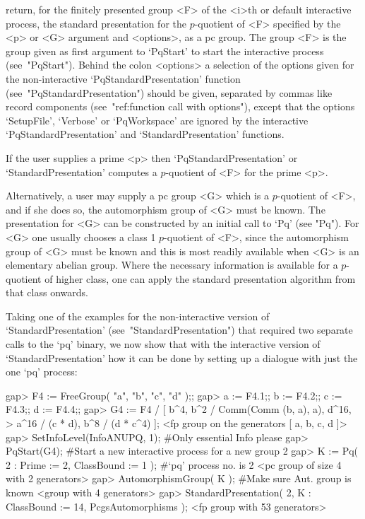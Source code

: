 return, for the finitely presented group <F>  of  the  <i>th  or  default
interactive  {\ANUPQ}  process,  the  standard   presentation   for   the
$p$-quotient of <F> specified by the <p> or <G> argument  and  <options>,
as a pc group. The group <F> is the group  given  as  first  argument  to
`PqStart' to start  the  interactive  {\ANUPQ}  process  (see~"PqStart").
Behind the colon <options> a selection  of  the  options  given  for  the
non-interactive             `PqStandardPresentation'             function
(see~"PqStandardPresentation") should be given, separated by commas  like
record components (see~"ref:function call with options"), except that the
options `SetupFile',  `Verbose'  or  `PqWorkspace'  are  ignored  by  the
interactive    `PqStandardPresentation'    and     `StandardPresentation'
functions.

If the  user  supplies  a  prime  <p>  then  `PqStandardPresentation'  or
`StandardPresentation' computes a $p$-quotient of <F> for the prime <p>.

Alternatively, a user may supply a pc group <G> which is  a  $p$-quotient
of <F>, and if she does so, the automorphism group of <G> must be  known.
The presentation for <G> can be constructed by an initial  call  to  `Pq'
(see "Pq"). For <G> one usually chooses a class 1  $p$-quotient  of  <F>,
since the automorphism group of <G>  must  be  known  and  this  is  most
readily available when <G> is an  elementary  abelian  group.  Where  the
necessary information is available for a $p$-quotient  of  higher  class,
one can  apply  the  standard  presentation  algorithm  from  that  class
onwards.

Taking  one  of  the  examples  for  the   non-interactive   version   of
`StandardPresentation'  (see~"StandardPresentation")  that  required  two
separate calls to the `pq' binary, we now show that with the  interactive
version of `StandardPresentation' how it can be  done  by  setting  up  a
dialogue with just the one `pq' process:

\beginexample
gap> F4 := FreeGroup( "a", "b", "c", "d" );;
gap> a := F4.1;; b := F4.2;; c := F4.3;; d := F4.4;;
gap> G4 := F4 / [ b^4, b^2 / Comm(Comm (b, a), a), d^16,
>                 a^16 / (c * d), b^8 / (d * c^4) ];
<fp group on the generators [ a, b, c, d ]>
gap> SetInfoLevel(InfoANUPQ, 1); #Only essential Info please
gap> PqStart(G4); #Start a new interactive process for a new group
2
gap> K := Pq( 2 : Prime := 2, ClassBound := 1 ); #`pq' process no. is 2
<pc group of size 4 with 2 generators>
gap> AutomorphismGroup( K );     #Make sure Aut. group is known
<group with 4 generators>
gap> StandardPresentation( 2, K : ClassBound := 14, PcgsAutomorphisms );
<fp group with 53 generators>
\endexample

